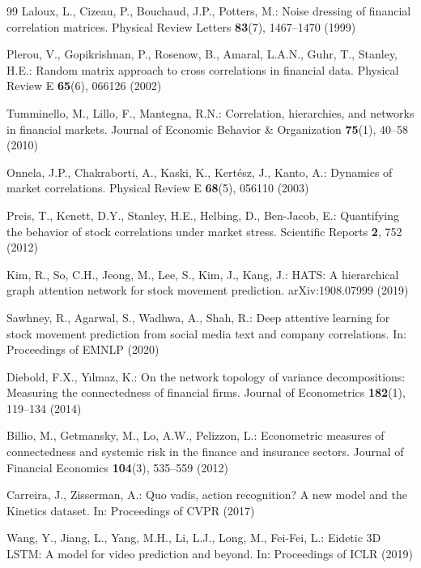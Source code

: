 \documentclass[runningheads]{llncs}
\begin{document}
\begin{thebibliography}{99}
Laloux, L., Cizeau, P., Bouchaud, J.P., Potters, M.: Noise dressing of
financial correlation matrices. Physical Review Letters \textbf{83}(7),
1467--1470 (1999)

Plerou, V., Gopikrishnan, P., Rosenow, B., Amaral, L.A.N., Guhr, T.,
Stanley, H.E.: Random matrix approach to cross correlations in financial
data. Physical Review E \textbf{65}(6), 066126 (2002)

Tumminello, M., Lillo, F., Mantegna, R.N.: Correlation, hierarchies, and
networks in financial markets. Journal of Economic Behavior \&
Organization \textbf{75}(1), 40--58 (2010)

Onnela, J.P., Chakraborti, A., Kaski, K., Kert\'esz, J., Kanto, A.:
Dynamics of market correlations. Physical Review E \textbf{68}(5),
056110 (2003)

Preis, T., Kenett, D.Y., Stanley, H.E., Helbing, D., Ben-Jacob, E.:
Quantifying the behavior of stock correlations under market stress.
Scientific Reports \textbf{2}, 752 (2012)

Kim, R., So, C.H., Jeong, M., Lee, S., Kim, J., Kang, J.: HATS: A
hierarchical graph attention network for stock movement prediction.
arXiv:1908.07999 (2019)

Sawhney, R., Agarwal, S., Wadhwa, A., Shah, R.: Deep attentive learning
for stock movement prediction from social media text and company
correlations. In: Proceedings of EMNLP (2020)

Diebold, F.X., Y{\i}lmaz, K.: On the network topology of variance
decompositions: Measuring the connectedness of financial firms. Journal
of Econometrics \textbf{182}(1), 119--134 (2014)

Billio, M., Getmansky, M., Lo, A.W., Pelizzon, L.: Econometric measures
of connectedness and systemic risk in the finance and insurance sectors.
Journal of Financial Economics \textbf{104}(3), 535--559 (2012)

Carreira, J., Zisserman, A.: Quo vadis, action recognition? A new model
and the Kinetics dataset. In: Proceedings of CVPR (2017)

Wang, Y., Jiang, L., Yang, M.H., Li, L.J., Long, M., Fei-Fei, L.:
Eidetic 3D LSTM: A model for video prediction and beyond. In:
Proceedings of ICLR (2019)


\end{thebibliography}
\end{document}

